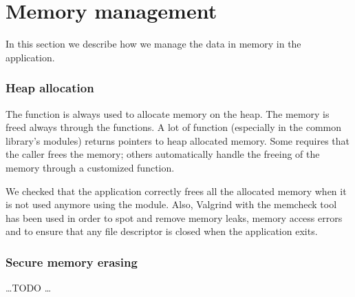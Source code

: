 \section{Memory management}\label{sec:memory}

In this section we describe how we manage the data in memory in the application.

\subsubsection{Heap allocation}

The  function is always used to allocate memory on the
heap. The memory is freed always through the 
functions. A lot of function (especially in the common library's modules)
returns pointers to heap allocated memory. Some requires that the caller frees
the memory; others automatically handle the freeing of the memory through a
customized  function.

We checked that the application correctly frees all the allocated memory when it
is not used anymore using the  module. Also, Valgrind with the
memcheck tool has been used in order to spot and remove memory leaks, memory
access errors and to ensure that any file descriptor is closed when the
application exits.

\subsubsection{Secure memory erasing}

\ldots TODO \ldots
